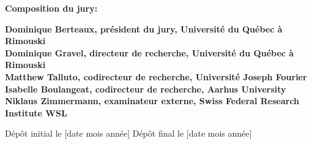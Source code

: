\thispagestyle{empty}

\null
\vfill
\noindent \textbf{Composition du jury:}\\
\vspace{1cm}

\begin{singlespace}
  \noindent \textbf{Dominique Berteaux, président du jury, Université du Québec à Rimouski}\\

  \noindent \textbf{Dominique Gravel, directeur de recherche, Université du Québec à Rimouski}\\

  \noindent \textbf{Matthew Talluto, codirecteur de recherche, Université Joseph Fourier}\\

  \noindent \textbf{Isabelle Boulangeat, codirecteur de recherche, Aarhus University}\\

  \noindent \textbf{Niklaus Zimmermann, examinateur externe, Swiss Federal Research Institute WSL}\\
\end{singlespace}

\vspace{2cm}
\noindent Dépôt initial le [date mois année]
\hspace{3cm}
Dépôt final le [date mois année]


\cleardoublepage
